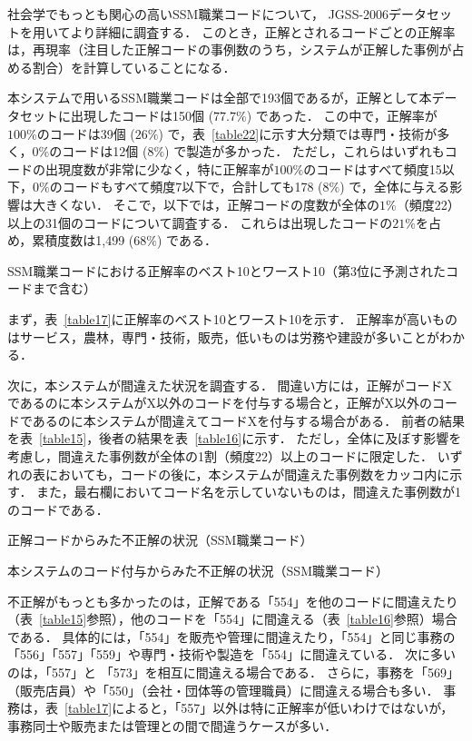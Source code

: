\documentclass[japanese]{jnlp_1.4}
\begin{document}
社会学でもっとも関心の高いSSM職業コードについて， JGSS-2006データセットを用いてより詳細に調査する．
このとき，正解とされるコードごとの正解率は，再現率（注目した正解コードの事例数のうち，システムが正解した事例が占める割合）を計算していることになる．

本システムで用いるSSM職業コードは全部で193個であるが，正解として本データセットに出現したコードは150個 ($77.7\%$) であった．
この中で，正解率が$100\%$のコードは39個 ($26\%$) で，表~\ref{table22}に示す大分類では専門・技術が多く，$0\%$のコードは12個 ($8\%$) で製造が多かった．
ただし，これらはいずれもコードの出現度数が非常に少なく，特に正解率が$100\%$のコードはすべて頻度15以下，$0\%$のコードもすべて頻度7以下で，合計しても178 ($8\%$) で，全体に与える影響は大きくない．
そこで，以下では，正解コードの度数が全体の$1\%$（頻度22）以上の31個のコードについて調査する．
これらは出現したコードの$21\%$を占め，累積度数は1,499 ($68\%$) である．

\begin{table}[b]
\caption{SSM職業コードにおける正解率のベスト10とワースト10（第3位に予測されたコードまで含む）}
\label{table17}

\end{table}

まず，表~\ref{table17}に正解率のベスト10とワースト10を示す．
正解率が高いものはサービス，農林，専門・技術，販売，低いものは労務や建設が多いことがわかる．

次に，本システムが間違えた状況を調査する．
間違い方には，正解がコードXであるのに本システムがX以外のコードを付与する場合と，正解がX以外のコードであるのに本システムが間違えてコードXを付与する場合がある．
前者の結果を表~\ref{table15}，後者の結果を表~\ref{table16}に示す．
ただし，全体に及ぼす影響を考慮し，間違えた事例数が全体の1割（頻度22）以上のコードに限定した．
いずれの表においても，コードの後に，本システムが間違えた事例数をカッコ内に示す．
また，最右欄においてコード名を示していないものは，間違えた事例数が1のコードである．

\begin{table}[b]
\caption{正解コードからみた不正解の状況（SSM職業コード）}
\label{table15}

\end{table}
\begin{table}[b]
\caption{本システムのコード付与からみた不正解の状況（SSM職業コード）}
\label{table16}

\end{table}

不正解がもっとも多かったのは，正解である「554」を他のコードに間違えたり（表~\ref{table15}参照），他のコードを「554」に間違える（表~\ref{table16}参照）場合である．
具体的には，「554」を販売や管理に間違えたり，「554」と同じ事務の「556」「557」「559」や専門・技術や製造を「554」に間違えている．
次に多いのは，「557」と 「573」を相互に間違える場合である．
さらに，事務を「569」（販売店員）や「550」（会社・団体等の管理職員）に間違える場合も多い．
事務は，表~\ref{table17}によると，「557」以外は特に正解率が低いわけではないが，事務同士や販売または管理との間で間違うケースが多い．
\end{document}
